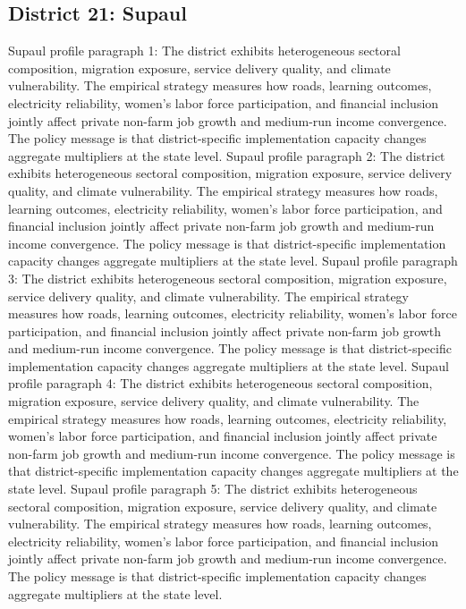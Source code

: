 \documentclass[preprint,12pt]{elsarticle}
\begin{document}
\subsection{District 21: Supaul}
Supaul profile paragraph 1: The district exhibits heterogeneous sectoral composition, migration exposure, service delivery quality, and climate vulnerability. The empirical strategy measures how roads, learning outcomes, electricity reliability, women's labor force participation, and financial inclusion jointly affect private non-farm job growth and medium-run income convergence. The policy message is that district-specific implementation capacity changes aggregate multipliers at the state level.
Supaul profile paragraph 2: The district exhibits heterogeneous sectoral composition, migration exposure, service delivery quality, and climate vulnerability. The empirical strategy measures how roads, learning outcomes, electricity reliability, women's labor force participation, and financial inclusion jointly affect private non-farm job growth and medium-run income convergence. The policy message is that district-specific implementation capacity changes aggregate multipliers at the state level.
Supaul profile paragraph 3: The district exhibits heterogeneous sectoral composition, migration exposure, service delivery quality, and climate vulnerability. The empirical strategy measures how roads, learning outcomes, electricity reliability, women's labor force participation, and financial inclusion jointly affect private non-farm job growth and medium-run income convergence. The policy message is that district-specific implementation capacity changes aggregate multipliers at the state level.
Supaul profile paragraph 4: The district exhibits heterogeneous sectoral composition, migration exposure, service delivery quality, and climate vulnerability. The empirical strategy measures how roads, learning outcomes, electricity reliability, women's labor force participation, and financial inclusion jointly affect private non-farm job growth and medium-run income convergence. The policy message is that district-specific implementation capacity changes aggregate multipliers at the state level.
Supaul profile paragraph 5: The district exhibits heterogeneous sectoral composition, migration exposure, service delivery quality, and climate vulnerability. The empirical strategy measures how roads, learning outcomes, electricity reliability, women's labor force participation, and financial inclusion jointly affect private non-farm job growth and medium-run income convergence. The policy message is that district-specific implementation capacity changes aggregate multipliers at the state level.
\end{document}
